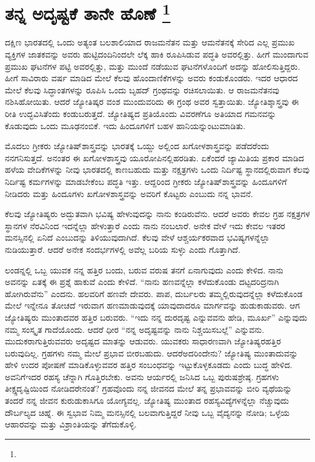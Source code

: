 
\vspace{-0.5cm}

\chapter[ತನ್ನ ಅದೃಷ್ಟಕೆ ತಾನೇ ಹೊಣೆ ]{ತನ್ನ ಅದೃಷ್ಟಕೆ ತಾನೇ ಹೊಣೆ \protect\footnote{}}

ದಕ್ಷಿಣ ಭಾರತದಲ್ಲಿ ಒಂದು ಅತ್ಯಂತ ಬಲಶಾಲಿಯಾದ ರಾಜಮನೆತನ ಮತ್ತು ಆ\break ಮನೆತನಕ್ಕೆ ಸೇರಿದ ಎಲ್ಲ ಪ್ರಮುಖ ವ್ಯಕ್ತಿಗಳ ಜಾತಕವನ್ನು ಅವರು ಹುಟ್ಟಿದಂದಿನಿಂದಲೇ ಲೆಕ್ಕ ಹಾಕಿ ರೂಪಿಸಿಡುವ ಪದ್ಧತಿ ಅವರಲ್ಲಿತ್ತು. ಹೀಗೆ ಮುಂದಾಗುವ ಪ್ರಮುಖ ಘಟನೆಗಳ ಪಟ್ಟಿ ಅವರಲ್ಲಿತ್ತು, ಮತ್ತು ಮುಂದೆ ನಡೆಯುವ ಘಟನೆಗಳೊಂದಿಗೆ ಅದನ್ನು ಹೋಲಿಸುತ್ತಿದ್ದರು. ಹೀಗೆ ಸಾವಿರಾರು ವರ್ಷ ಮಾಡಿದ ಮೇಲೆ ಕೆಲವು ಹೊಂದಾಣಿಕೆಗಳನ್ನು ಅವರು ಕಂಡುಕೊಂಡರು. ಇದರ ಆಧಾರದ ಮೇಲೆ ಕೆಲವು ಸಿದ್ಧಾಂತಗಳನ್ನು ರೂಪಿಸಿ ಒಂದು ಬೃಹದ್​ ಗ್ರಂಥವನ್ನು ರಚಿಸಲಾಯಿತು. ಆ ರಾಜಮನೆತನವು ನಶಿಸಿಹೋಯಿತು. ಆದರೆ ಜ್ಯೋತಿಷ್ಕರ ವಂಶ ಮುಂದುವರಿದು ಈ ಗ್ರಂಥ ಅವರ ಸ್ವತ್ತಾಯಿತು. ಜ್ಯೋತಿಶ್ಶಾಸ್ತ್ರವು ಈ ರೀತಿ ಉದ್ಭವಿಸಿತೆಂದು ಕಂಡುಬರುತ್ತದೆ. ಜ್ಯೋತಿಷ್ಯದ ಪ್ರತಿಯೊಂದು ವಿವರಣೆಗೂ ಅತಿಯಾದ ಗಮನವನ್ನು ಕೊಡುವುದು ಒಂದು ಮೂಢನಂಬಿಕೆ. ಇದು ಹಿಂದೂಗಳಿಗೆ ಬಹಳ ಹಾನಿಯನ್ನುಂಟುಮಾಡಿತು.

ಮೊದಲು ಗ್ರೀಕರು ಜ್ಯೋತಿಷ್​ಶಾಸ್ತ್ರವನ್ನು ಭಾರತಕ್ಕೆ ಒಯ್ದು ಅಲ್ಲಿಂದ ಖಗೋಳಶಾಸ್ತ್ರ\-ವನ್ನು ಪಡೆದರೆಂದು ನನಗನಿಸುತ್ತದೆ. ಅನಂತರ ಈ ಖಗೋಳಶಾಸ್ತ್ರವು ಯೂರೋಪಿನಲ್ಲಿ\break ಹರಡಿತು. ಏಕೆಂದರೆ ಜ್ಯಾಮಿತಿಯ ಪ್ರಕಾರ ಮಾಡಿದ ಹಳೆಯ ವೇದಿಕೆಗಳನ್ನು ನೀವು ಭಾರತದಲ್ಲಿ ಕಾಣಬಹುದು ಮತ್ತು ನಕ್ಷತ್ರಗಳು ಒಂದು ನಿರ್ದಿಷ್ಟ ಸ್ಥಾನದಲ್ಲಿರುವಾಗ ಕೆಲವು ನಿರ್ದಿಷ್ಟ ಕರ್ಮಗಳನ್ನು ಮಾಡಬೇಕೆಂಬ ಪದ್ಧತಿ ಇತ್ತು. ಆದ್ದರಿಂದ ಗ್ರೀಕರು ಜ್ಯೋತಿಷ್​ಶಾಸ್ತ್ರವನ್ನು ಹಿಂದೂಗಳಿಗೆ ನೀಡಿದರು ಮತ್ತು ಹಿಂದೂಗಳು ಖಗೋಳಶಾಸ್ತ್ರವನ್ನು ಅವರಿಗೆ ಕೊಟ್ಟರು ಎಂಬುದು ನನ್ನ ಭಾವನೆ.

\vskip 4pt

ಕೆಲವು ಜ್ಯೋತಿಷ್ಯರು ಅದ್ಭುತವಾಗಿ ಭವಿಷ್ಯ ಹೇಳುವುದನ್ನು ನಾನು ಕಂಡಿರುವೆನು. ಆದರೆ ಅವರು ಕೇವಲ ಗ್ರಹ ನಕ್ಷತ್ರಗಳ ಸ್ಥಾನಗಳ ನೆರವಿನಿಂದ ಇದನ್ನೆಲ್ಲಾ ಹೇಳುತ್ತಾರೆ ಎಂದು ನಾನು ನಂಬಲಾರೆ. ಅನೇಕ ವೇಳೆ ಇದು ಕೇವಲ ಇತರರ ಮನಸ್ಸಿನಲ್ಲಿ ಏನಿದೆ ಎಂಬು\-ದನ್ನು ತಿಳಿಯುವುದಾಗಿದೆ. ಕೆಲವು ವೇಳೆ ಆಶ್ಚರ್ಯಕರವಾದ ಭವಿಷ್ಯಗಳನ್ನೆಲ್ಲಾ ನುಡಿಯು\-ತ್ತಾರೆ. ಆದರೆ ಅನೇಕ ಸಂದರ್ಭಗಳಲ್ಲಿ ಅವೆಲ್ಲ ಬರಿಯ ಸುಳ್ಳು ಎಂದು ಗೊತ್ತಾಗಿದೆ.

\vskip 4pt

ಲಂಡನ್ನಲ್ಲಿ ಒಬ್ಬ ಯುವಕ ನನ್ನ ಹತ್ತಿರ ಬಂದು, ಬರುವ ವರುಷ ತನಗೆ ಏನಾಗುವುದು ಎಂದು ಕೇಳಿದ. ನಾನು ಅವನನ್ನು ಏತಕ್ಕೆ ಈ ಪ್ರಶ್ನೆ ಹಾಕುವೆ ಎಂದು ಕೇಳಿದೆ. “ನಾನು ಹಣವನ್ನೆಲ್ಲಾ ಕಳೆದುಕೊಂಡು ದಟ್ಟದರಿದ್ರನಾಗಿ ಹೋಗಿರುವೆನು” ಎಂದನು. ಹಲವರಿಗೆ ಹಣವೇ ದೇವರು. ಪಾಪ, ದುರ್ಬಲರು ತಮ್ಮಲ್ಲಿರುವುದನ್ನೆಲ್ಲಾ ಕಳೆದುಕೊಂಡ ಮೇಲೆ ಇನ್ನೇನೂ ತೋಚದೆ ಇರುವಾಗ ಹಣಮಾಡುವುದಕ್ಕೆ ಯಾವುದಾದರೂ ಮಾರ್ಗವನ್ನು ಹುಡುಕಾಡುವರು. ಆಗ ಜ್ಯೋತಿಷ್ಯರು ಮುಂತಾದವರ ಹತ್ತಿರ ಬರುವರು. “ಇದು ನನ್ನ ದುರದೃಷ್ಟ ಎನ್ನುವವನು ಹೇಡಿ, ಮೂರ್ಖ” ಎನ್ನುವುದು ನಮ್ಮ ಸಂಸ್ಕೃತ ಗಾದೆಯೊಂದು. ಆದರೆ ಧೀರ “ನನ್ನ ಅದೃಷ್ಟವನ್ನು ನಾನು ನಿಶ್ಚಯಿಸಬಲ್ಲೆ” ಎನ್ನುವನು. ಮುದುಕರಾಗುತ್ತಿರು\-ವವರು ಅದೃಷ್ಟದ ಮಾತನ್ನು ಆಡುವರು. ಯುವಕರು ಸಾಧಾರಣವಾಗಿ ಜ್ಯೋತಿಷ್ಯರ\break ಹತ್ತಿರ ಬರುವುದಿಲ್ಲ. ಗ್ರಹಗಳು ನಮ್ಮ ಮೇಲೆ ಪ್ರಭಾವ ಬೀರಬಹುದು. ಆದರೆ\break ಅದರಿಂದೇನು? ಜ್ಯೋತಿಷ್ಯ ಮುಂತಾದುವನ್ನು ಹೇಳಿ ಉದರ ಪೋಷಣೆ ಮಾಡಿಕೊಳ್ಳುವವರ ಹತ್ತಿರ ಸಂಬಂಧವನ್ನು ಇಟ್ಟುಕೊಳ್ಳಕೂಡದು ಎಂದು ಬುದ್ಧ ಹೇಳಿದ. ಅವನಿಗೆ\break ಇದರ ರಹಸ್ಯ ಚೆನ್ನಾಗಿ ಗೊತ್ತಿರಬೇಕು. ಅವನು ಆರ್ಯರಲ್ಲಿ ಜನಿಸಿದ ಒಬ್ಬ ಪುರುಷ\break ಶ್ರೇಷ್ಠ. ಗ್ರಹಗಳು ತೀಕ್ಷ್ಣದೃಷ್ಟಿಯಿಂದ ನೋಡಿದರೇನಂತೆ? ಗ್ರಹವೊಂದು ನನ್ನ ಜೀವನದ ಮೇಲೆ ತನ್ನ ಪ್ರಭಾವವನ್ನು ಬೀರಿ ವ್ಯಥೆಯನ್ನು ತಂದರೆ ನನ್ನ ಜೀವನ ಕುರುಡುಕಾಸಿಗೂ ಯೋಗ್ಯವಲ್ಲ. ಜ್ಯೋತಿಷ್ಯ ಮುಂತಾದ ರಹಸ್ಯವಿದ್ಯೆಗಳನ್ನೆಲ್ಲಾ ನೆಚ್ಚುವುದು ದೌರ್ಬಲ್ಯದ ಚಿಹ್ನೆ. ಈ ಸ್ವಭಾವ ನಿಮ್ಮ ಮನಸ್ಸಿನಲ್ಲಿ ಬಲವಾಗುತ್ತಿದ್ದರೆ ನೀವು ಒಬ್ಬ ವೈದ್ಯನನ್ನು ನೋಡಿ; ಒಳ್ಳೆಯ ಆಹಾರವನ್ನು ಮತ್ತು ವಿಶ್ರಾಂತಿಯನ್ನು ತೆಗೆದುಕೊಳ್ಳಿ.

